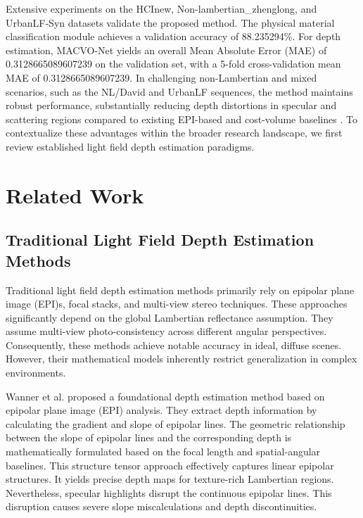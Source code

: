 \documentclass[lettersize,journal]{IEEEtran}
\begin{document}
Extensive experiments on the HCInew, Non-lambertian\_zhenglong, and UrbanLF-Syn datasets validate the proposed method. The physical material classification module achieves a validation accuracy of 88.235294\%. For depth estimation, MACVO-Net yields an overall Mean Absolute Error (MAE) of 0.3128665089607239 on the validation set, with a 5-fold cross-validation mean MAE of 0.3128665089607239. In challenging non-Lambertian and mixed scenarios, such as the NL/David and UrbanLF sequences, the method maintains robust performance, substantially reducing depth distortions in specular and scattering regions compared to existing EPI-based and cost-volume baselines \cite{li2021, zhang2023}. To contextualize these advantages within the broader research landscape, we first review established light field depth estimation paradigms.

\section{Related Work}

\subsection{Traditional Light Field Depth Estimation Methods}

Traditional light field depth estimation methods primarily rely on epipolar plane image (EPI)s, focal stacks, and multi-view stereo techniques. These approaches significantly depend on the global Lambertian reflectance assumption. They assume multi-view photo-consistency across different angular perspectives. Consequently, these methods achieve notable accuracy in ideal, diffuse scenes. However, their mathematical models inherently restrict generalization in complex environments.

Wanner et al. \cite{wanner2014} proposed a foundational depth estimation method based on epipolar plane image (EPI) analysis. They extract depth information by calculating the gradient and slope of epipolar lines. The geometric relationship between the slope of epipolar lines and the corresponding depth is mathematically formulated based on the focal length and spatial-angular baselines. This structure tensor approach effectively captures linear epipolar structures. It yields precise depth maps for texture-rich Lambertian regions. Nevertheless, specular highlights disrupt the continuous epipolar lines. This disruption causes severe slope miscalculations and depth discontinuities.
\end{document}
